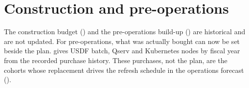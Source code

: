 \section{Construction and pre-operations}\label{sec:uppreops}

The construction budget () and the pre-operations build-up
() are historical and are not updated. For
pre-operations, what was actually bought can now be set beside the plan.
 gives USDF batch, Qserv and Kubernetes nodes by fiscal
year from the recorded purchase history. These purchases, not the plan, are
the cohorts whose replacement drives the refresh schedule in the operations
forecast ().


